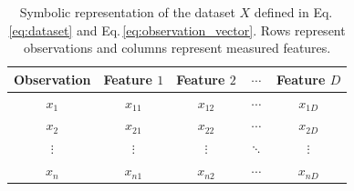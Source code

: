 \documentclass[11pt,a4paper]{article}
\theoremstyle{definition}
\theoremstyle{plain}
\begin{document}
\begin{table}[htbp]
\centering
\begingroup
\renewcommand{\arraystretch}{1.30}
\caption{Symbolic representation of the dataset $X$ defined in Eq.\,\eqref{eq:dataset} and Eq.\,\eqref{eq:observation_vector}. Rows represent observations and columns represent measured features.}
\label{tab:dataset_notation}
\begin{tabular}{c c c c c}
\toprule
Observation & Feature $1$ & Feature $2$ & $\cdots$ & Feature $D$\\
\midrule
$x_1$ & $x_{11}$ & $x_{12}$ & $\cdots$ & $x_{1D}$\\
$x_2$ & $x_{21}$ & $x_{22}$ & $\cdots$ & $x_{2D}$\\
$\vdots$ & $\vdots$ & $\vdots$ & $\ddots$ & $\vdots$\\
$x_n$ & $x_{n1}$ & $x_{n2}$ & $\cdots$ & $x_{nD}$\\
\bottomrule
\end{tabular}
\endgroup
\end{table}
\end{document}
